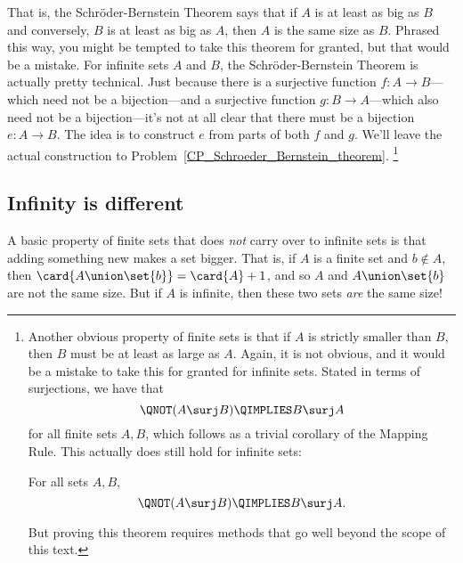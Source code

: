 That is, the Schr\"oder-Bernstein Theorem says that if $A$ is at least
as big as $B$ and conversely, $B$ is at least as big as $A$, then $A$
is the same size as $B$.  Phrased this way, you might be tempted to
take this theorem for granted, but that would be a mistake.  For
infinite sets $A$ and $B$, the Schr\"oder-Bernstein Theorem is
actually pretty technical.  Just because there is a surjective
function $f:A\to B$---which need not be a bijection---and a surjective
function $g:B \to A$---which also need not be a bijection---it's not
at all clear that there must be a bijection $e:A \to B$.  The idea is
to construct $e$ from parts of both $f$ and $g$.  We'll leave the
actual construction to Problem~\ref{CP_Schroeder_Bernstein_theorem}.
\footnote{Another obvious property of finite sets is that if $A$ is
  strictly smaller than $B$, then $B$ must be at least as large as
  $A$.  Again, it is not obvious, and it would be a mistake to take
  this for granted for infinite sets.  Stated in terms of surjections,
  we have that
  \[
  \QNOT(A \surj B) \QIMPLIES B \surj A
  \]
  for all finite sets $A,B$, which follows as a trivial corollary of
  the Mapping Rule.  This actually does still hold for infinite sets:
  \begin{theorem*}
    For all sets $A,B$,
    \[
    \QNOT(A \surj B) \QIMPLIES B \surj A.
    \]
  \end{theorem*}
  But proving this theorem requires methods that go well beyond the
  scope of this text.}

\subsection{Infinity is different}

A basic property of finite sets that does \emph{not} carry over to
infinite sets is that adding something new makes a set bigger.  That
is, if $A$ is a finite set and $b \notin A$, then $\card{A \union
  \set{b}} = \card{A}+1$, and so $A$ and $A \union \set{b}$ are not
the same size.  But if $A$ is infinite, then these two sets \emph{are}
the same size!

